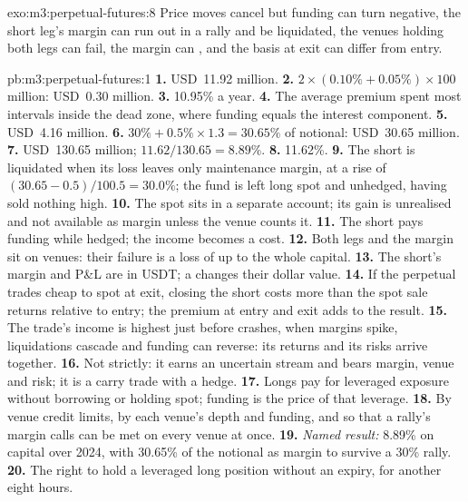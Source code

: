 \begin{solution}{exo:m3:perpetual-futures:8}
Price moves cancel but funding can turn negative, the short leg's margin can run out in a rally and be liquidated,
the venues holding both legs can fail, the  margin can , and the basis at exit can differ from entry.
\end{solution}

\begin{solution}{pb:m3:perpetual-futures:1}
\textbf{1.} USD~11.92 million. \textbf{2.} $2 \times (0.10\% + 0.05\%) \times 100$ million: USD~0.30 million.
\textbf{3.} 10.95\% a year. \textbf{4.} The average premium spent most intervals inside the dead zone, where funding
equals the interest component. \textbf{5.} USD~4.16 million. \textbf{6.} $30\% + 0.5\% \times 1.3 = 30.65\%$ of
notional: USD~30.65 million. \textbf{7.} USD~130.65 million; $11.62/130.65 = 8.89\%$. \textbf{8.} 11.62\%.
\textbf{9.} The short is liquidated when its loss leaves only maintenance margin, at a rise of $(30.65 -
0.5)/100.5 = 30.0\%$; the fund is left long spot and unhedged, having sold nothing high. \textbf{10.} The spot sits
in a separate account; its gain is unrealised and not available as margin unless the venue counts it.
\textbf{11.} The short pays funding while hedged; the income becomes a cost. \textbf{12.} Both legs and the margin
sit on venues: their failure is a loss of up to the whole capital. \textbf{13.} The short's margin and P\&L are in
USDT; a  changes their dollar value. \textbf{14.} If the perpetual trades cheap to spot at exit, closing the
short costs more than the spot sale returns relative to entry; the premium at entry and exit adds to the result.
\textbf{15.} The trade's income is highest just before crashes, when margins spike, liquidations cascade and funding
can reverse: its returns and its risks arrive together. \textbf{16.} Not strictly: it earns an uncertain stream and
bears margin, venue and  risk; it is a carry trade with a hedge. \textbf{17.} Longs pay for leveraged
exposure without borrowing or holding spot; funding is the price of that leverage. \textbf{18.} By venue credit
limits, by each venue's depth and funding, and so that a rally's margin calls can be met on every venue at once.
\textbf{19.} \emph{Named result:} 8.89\% on capital over 2024, with 30.65\% of the notional as margin to survive a
30\% rally. \textbf{20.} The right to hold a leveraged long position without an expiry, for another eight hours.
\end{solution}

